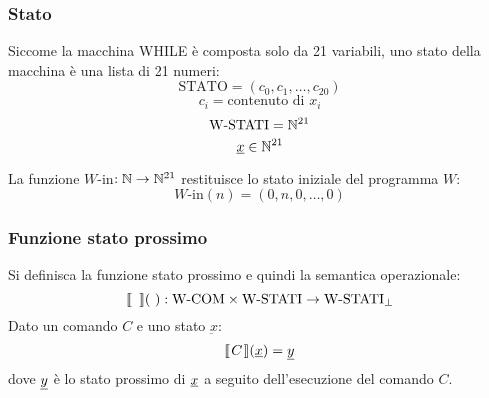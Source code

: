 \subsubsection*{Stato}
Siccome la macchina WHILE è composta solo da 21 variabili, uno stato della macchina è
una lista di 21 numeri:
$$ \text{STATO} = (c_0,c_1,\dots,c_{20}) $$
$$ c_i = \text{contenuto di $x_i$} $$
$$ \text{W-STATI} = \mathbb{N}^{21} $$
$$ \underbar{$x$}\in\mathbb{N}^{21} $$

La funzione $W$-in$:\mathbb{N}\to\mathbb{N}^{21}$ restituisce lo stato iniziale del programma $W$:
$$ W\text{-in}(n) = (0,n,0,\dots,0) $$

\subsubsection*{Funzione stato prossimo}
Si definisca la funzione stato prossimo e quindi la semantica operazionale:
$$\opsemWHILE{\ }{\ }: \text{W-COM}\times\text{W-STATI}\to\text{W-STATI}_\perp$$
Dato un comando $C$ e uno stato $\underbar{x}$:
$$ \opsemWHILE{C}{\sottolinea{x}} = \sottolinea{y} $$
dove $\text{\underline{$y$}}$ è lo stato prossimo di $\text{\underline{$x$}}$ a seguito dell'esecuzione del
comando $C$.

